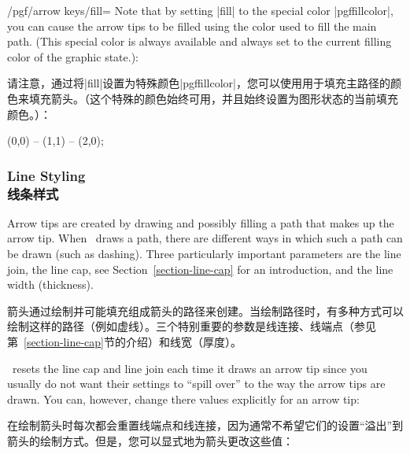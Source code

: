 \begin{key}{/pgf/arrow keys/fill=}
    Note that by setting |fill| to the special color |pgffillcolor|, you can
    cause the arrow tips to be filled using the color used to fill the main
    path. (This special color is always available and always set to the current
    filling color of the graphic state.):
    
    请注意，通过将|fill|设置为特殊颜色|pgffillcolor|，您可以使用用于填充主路径的颜色来填充箭头。（这个特殊的颜色始终可用，并且始终设置为图形状态的当前填充颜色。）：
\begin{codeexample}[width=3cm,preamble={\usetikzlibrary{arrows.meta}}]
 \draw [draw=red, fill=red!50,
                           arrows = {-Stealth[length=15pt, fill=pgffillcolor]}]
                          (0,0) -- (1,1) -- (2,0);
\end{codeexample}
\end{key}


\subsubsection{Line Styling\\线条样式}
\label{section-arrow-key-caps}

Arrow tips are created by drawing and possibly filling a path that makes up the
arrow tip. When \tikzname\ draws a path, there are different ways in which such
a path can be drawn (such as dashing). Three particularly important parameters
are the line join, the line cap, see Section~\ref{section-line-cap} for an
introduction, and the line width (thickness).

箭头通过绘制并可能填充组成箭头的路径来创建。当\tikzname 绘制路径时，有多种方式可以绘制这样的路径（例如虚线）。三个特别重要的参数是线连接、线端点（参见第~\ref{section-line-cap}节的介绍）和线宽（厚度）。

\tikzname\ resets the line cap and line join each time it draws an arrow tip
since you usually do not want their settings to ``spill over'' to the way the
arrow tips are drawn. You can, however, change there values explicitly for an
arrow tip:

\tikzname 在绘制箭头时每次都会重置线端点和线连接，因为通常不希望它们的设置“溢出”到箭头的绘制方式。但是，您可以显式地为箭头更改这些值：

